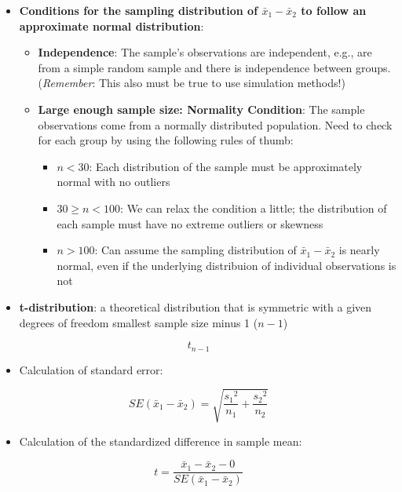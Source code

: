 \documentclass[
]{report}
\providecommand{\tightlist}{%
  \setlength{\itemsep}{0pt}\setlength{\parskip}{0pt}}
\begin{document}
\begin{itemize}
\item
  \textbf{Conditions for the sampling distribution of \(\bar{x}_1 - \bar{x}_2\) to follow an approximate normal distribution}:

  \begin{itemize}
  \item
    \textbf{Independence}: The sample's observations are independent, e.g., are from a simple random sample and there is independence between groups. (\emph{Remember}: This also must be true to use simulation methods!)
  \item
    \textbf{Large enough sample size: Normality Condition}: The sample observations come from a normally distributed population. Need to check for each group by using the following rules of thumb:

    \begin{itemize}
    \item
      \(n < 30\): Each distribution of the sample must be approximately normal with no outliers
    \item
      \(30 \ge n < 100\): We can relax the condition a little; the distribution of each sample must have no extreme outliers or skewness
    \item
      \(n > 100\): Can assume the sampling distribution of \(\bar{x}_1 - \bar{x}_2\) is nearly normal, even if the underlying distribuion of individual observations is not
    \end{itemize}
  \end{itemize}
\item
  \textbf{t-distribution}: a theoretical distribution that is symmetric with a given degrees of freedom smallest sample size minus 1 (\(n-1\))
\end{itemize}

\[t_{n-1}\]

\begin{itemize}
\tightlist
\item
  Calculation of standard error:
\end{itemize}

\[SE(\bar{x}_1 - \bar{x}_2) = \sqrt{\frac{{s_1}^2}{n_1}+\frac{{s_2}^2}{n_2}}\]

\begin{itemize}
\tightlist
\item
  Calculation of the standardized difference in sample mean:
\end{itemize}

\[t = \frac{\bar{x}_1-\bar{x}_2-0}{SE(\bar{x}_1 - \bar{x}_2)}\]
\end{document}
